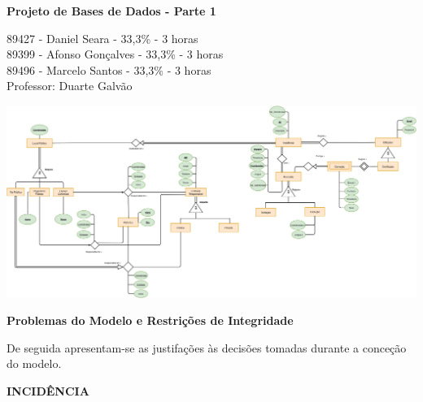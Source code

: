 \documentclass[10pt]{report}
\begin{document}
    \begin{titlepage}
        \begin{center}

            \vspace*{\fill}
            \Huge
            \textbf{Projeto de Bases de Dados - Parte 1}
            
            \vspace*{\fill}

            \Large
            89427 - Daniel Seara - 33,3\% - 3 horas \\
            89399 - Afonso Gonçalves - 33,3\% - 3 horas \\
            89496 - Marcelo Santos - 33,3\% - 3 horas \\

            \bigskip
            Professor: Duarte Galvão
        
        \end{center}
\end{titlepage}

\begin{center}
    \vspace*{-2cm}
    \includegraphics[width=1.4\textwidth, angle=90]{BDProj1.jpg}
\end{center}
\newpage

    \LARGE
    \begin{center}
        \textbf{Problemas do Modelo e Restrições de Integridade}
    \end{center}

    \bigskip
    \bigskip

    \normalsize

    \noindent De seguida apresentam-se as justifações às decisões tomadas durante a conceção do modelo. 

    \vspace*{10mm}
    \noindent\textbf{INCIDÊNCIA}
\end{document}
